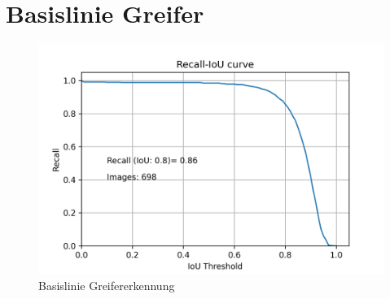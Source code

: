 \chapter{Basislinie Greifer}
\label{appendix:BasislinieGreifer}


\begin{figure}[h]
	\centering
	\includegraphics[width=1\textwidth, center]{bilder/Anhang/Baseline/Grapple/RecallIoU_Validation.png}
	\caption[RecallIoUGrappleBaseline]{Basislinie Greifererkennung}
	\label{img:RecallIoUGrappleBaseline}
\end{figure}	
